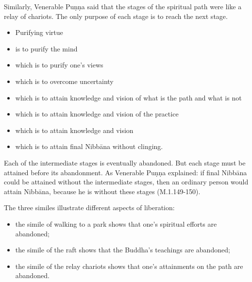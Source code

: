 Similarly, Venerable Puṇṇa said that the stages of the spiritual path were like a relay of chariots. The only purpose of each stage is to reach the next stage.

\begin{itemize}
\item Purifying virtue
\item is to purify the mind
\item which is to purify one's views
\item which is to overcome uncertainty
\item which is to attain knowledge and vision of what is the path and what is not
\item which is to attain knowledge and vision of the practice
\item which is to attain knowledge and vision
\item which is to attain final Nibbāna without clinging.
\end{itemize}

Each of the intermediate stages is eventually abandoned. But each stage must be attained before its abandonment. As Venerable Puṇṇa explained: if final Nibbāna could be attained without the intermediate stages, then an ordinary person would attain Nibbāna, because he is without these stages (M.1.149-150).

The three similes illustrate different aspects of liberation:

\begin{itemize}
\item the simile of walking to a park shows that one's spiritual efforts are abandoned;
\item the simile of the raft shows that the Buddha's teachings are abandoned;
\item the simile of the relay chariots shows that one's attainments on the path are abandoned.
\end{itemize}

